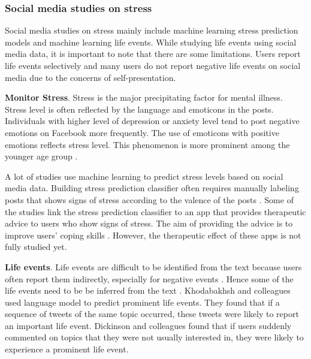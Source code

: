 \subsubsection{Social media studies on stress}
Social media studies on stress mainly include machine learning stress prediction models and machine learning life events. While studying life events using social media data, it is important to note that there are some limitations. Users report life events selectively and many users do not report negative life events on social media due to the concerns of self-presentation.

\textbf{Monitor Stress}. Stress is the major precipitating factor for mental illness.  Stress level is often reflected by the language and emoticons in the posts. Individuals with higher level of depression or anxiety level tend to post negative emotions on Facebook more frequently. The use of emoticons with positive emotions reflects stress level. This phenomenon is more prominent among the younger age group \cite{settanni2015sharing}.

A lot of studies use machine learning to predict stress levels based on social media data. Building stress prediction classifier often requires manually labeling posts that shows signs of stress according to the valence of the posts \cite{thelwall2017tensistrength,mogadala2012twitter,lin2014user}. 
Some of the studies link the stress prediction classifier to an app that provides therapeutic advice to users who show signs of stress. The aim of providing the advice is to improve users' coping skills \cite{li2014helping}. However, the therapeutic effect of these apps is not fully studied yet.

\textbf{Life events}. Life events are difficult to be identified from the text because users often report them indirectly, especially for negative events \cite{bevan2015important}. Hence some of the life events need to be be inferred from the text \cite{khodabakhsh2018detecting,abe2018predicting}.  Khodabakhsh and colleagues \citet{khodabakhsh2018detecting} used language model to predict prominent life events. They found that if a sequence of tweets of the same topic occurred, these tweets were likely to report an important life event. Dickinson and colleagues \citet{dickinson2015identifying}found that if users suddenly commented on topics that they were not usually interested in, they were likely to experience a prominent life event.

